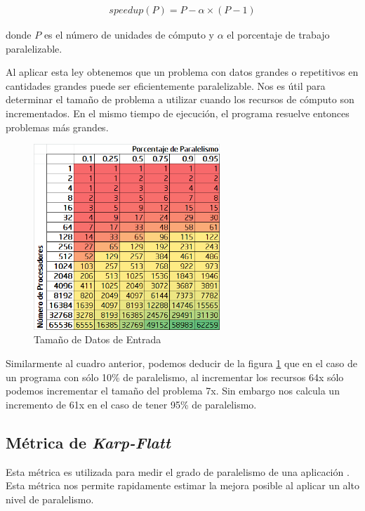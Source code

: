 \documentclass[a4paper]{report}
\begin{document}
\begin{eqnarray}
\label{eq:gustafson}
speedup(P) = P - \alpha \times ( P - 1)
\end{eqnarray}

donde $ P $ es el n\'umero de unidades de c\'omputo y $ \alpha $ el porcentaje de trabajo paralelizable.

\bigskip

Al aplicar esta ley obtenemos que un problema con datos grandes o repetitivos en cantidades grandes puede ser
eficientemente paralelizable. Nos es \'util para determinar el tama\~no de problema a utilizar cuando los recursos de c\'omputo son incrementados.
En el mismo tiempo de ejecuci\'on, el programa resuelve entonces problemas m\'as grandes.

\begin{figure}[H]
\begin{center}
\includegraphics[width=7cm]{gustafson.png}
\caption{Tama\~no de Datos de Entrada}
\label{fig:gustafson}
\end{center}
\end{figure}

Similarmente al cuadro anterior, podemos deducir de la figura \ref{fig:gustafson} que en el caso de un programa con s\'olo 10\% de paralelismo,
al incrementar los recursos 64x s\'olo podemos incrementar el tama\~no del problema 7x. Sin embargo nos calcula
un incremento de 61x en el caso de tener 95\% de paralelismo.

\subsection{M\'etrica de {\it Karp-Flatt}}

Esta m\'etrica es utilizada para medir el grado de paralelismo de una aplicaci\'on \cite{karp-flatt}.
Esta m\'etrica nos permite rapidamente estimar la mejora posible al aplicar un alto nivel de paralelismo.
\end{document}
